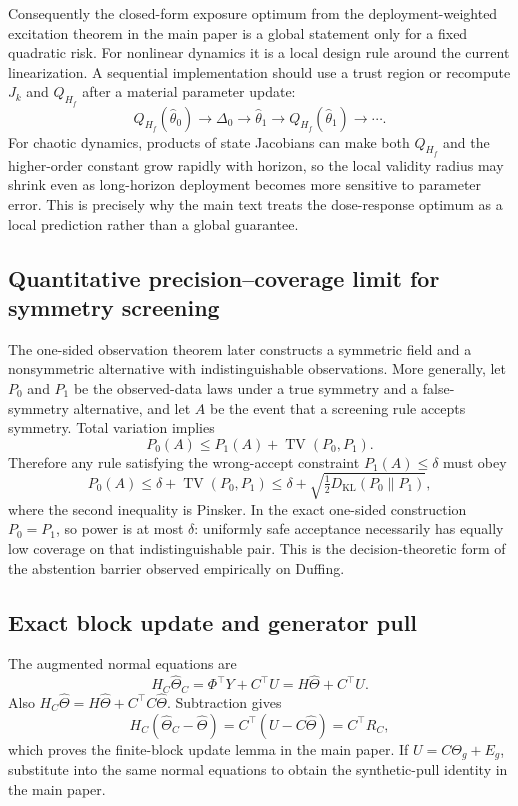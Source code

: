 Consequently the closed-form exposure optimum from the deployment-weighted excitation theorem in the main paper is a global statement only for a fixed quadratic risk. For nonlinear dynamics it is a local design rule around the current linearization. A sequential implementation should use a trust region or recompute $J_k$ and $Q_{H_f}$ after a material parameter update:
\[
Q_{H_f}(\widehat\theta_0)\to \Delta_0\to \widehat\theta_1
\to Q_{H_f}(\widehat\theta_1)\to\cdots.
\]
For chaotic dynamics, products of state Jacobians can make both $Q_{H_f}$ and the higher-order constant grow rapidly with horizon, so the local validity radius may shrink even as long-horizon deployment becomes more sensitive to parameter error. This is precisely why the main text treats the dose-response optimum as a local prediction rather than a global guarantee.

\subsection{Quantitative precision--coverage limit for symmetry screening}\label{app:screening-bound}
The one-sided observation theorem later constructs a symmetric field and a nonsymmetric alternative with indistinguishable observations. More generally, let $P_0$ and $P_1$ be the observed-data laws under a true symmetry and a false-symmetry alternative, and let $A$ be the event that a screening rule accepts symmetry. Total variation implies
\[
P_0(A)\le P_1(A)+\operatorname{TV}(P_0,P_1).
\]
Therefore any rule satisfying the wrong-accept constraint $P_1(A)\le\delta$ must obey
\[
P_0(A)\le\delta+\operatorname{TV}(P_0,P_1)
\le\delta+\sqrt{\tfrac12D_{\mathrm{KL}}(P_0\|P_1)},
\]
where the second inequality is Pinsker. In the exact one-sided construction $P_0=P_1$, so power is at most $\delta$: uniformly safe acceptance necessarily has equally low coverage on that indistinguishable pair. This is the decision-theoretic form of the abstention barrier observed empirically on Duffing.

\subsection{Exact block update and generator pull}
The augmented normal equations are
\[
H_C\widehat\Theta_C=\Phi^\top Y+C^\top U=H\widehat\Theta+C^\top U.
\]
Also $H_C\widehat\Theta=H\widehat\Theta+C^\top C\widehat\Theta$. Subtraction gives
\[
H_C(\widehat\Theta_C-\widehat\Theta)=C^\top(U-C\widehat\Theta)=C^\top R_C,
\]
which proves the finite-block update lemma in the main paper. If $U=C\Theta_g+E_g$, substitute into the same normal equations to obtain the synthetic-pull identity in the main paper.

